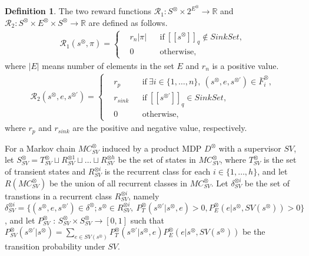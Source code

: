 \documentclass[10pt]{article}
\theoremstyle{definition}
\newtheorem{definition}{Definition}
\newcommand{\myspq}{\ensuremath{[\![s^{\otimes}]\!]}_q}
\newcommand{\myspdq}{\ensuremath{[\![s^{\otimes \prime}]\!]}_q}
\begin{document}
\begin{definition}
  The two reward functions $\mathcal{R}_1 : S^{\otimes} \times 2^{E^{\otimes}} \rightarrow \mathbb{R}$ and $\mathcal{R}_2 : S^{\otimes} \times E^{\otimes} \times S^{\otimes} \rightarrow \mathbb{R}$ are defined as follows.
  \begin{align}
    \mathcal{R}_1 (s^{\otimes}, \pi) =
    \left\{
    \begin{aligned}
      & r_{n}|\pi| & &\text{if} \ \myspq \notin SinkSet , \\
      & 0 & &\text{otherwise},
    \end{aligned}
    \right.
  \end{align}
  where $|E|$ means number of elements in the set $E$ and $r_{n}$ is a positive value.
  \begin{align}
    \mathcal{R}_2(s^{\otimes}, e, s^{\otimes \prime}) =
    \left\{
    \begin{aligned}
      &r_p & & \text{if}\ \exists i \in \! \{ 1, \ldots ,n \},\ (s^{\otimes}, e, s^{\otimes \prime}) \in \bar{F}^{\otimes}_i \!,\\
      &r_{sink} & & \text{if}\ \myspdq \in SinkSet,\\
      &0 & & \text{otherwise},
    \end{aligned}
    \right.
  \end{align}
  where $r_p$ and $r_{sink}$ are the positive and negative value, respectively.
  \label{reward_def}
\end{definition}

For a Markov chain $MC^{\otimes}_{SV}$ induced by a product MDP $D^{\otimes}$ with a supervisor $SV$, let $S^{\otimes}_{SV}= T^{\otimes}_{SV} \sqcup R^{\otimes 1}_{SV} \sqcup \ldots \sqcup R^{\otimes h}_{SV}$ be the set of states in $MC^{\otimes}_{SV}$, where $T^{\otimes}_{SV}$ is the set of transient states and $R^{\otimes i}_{SV}$ is the recurrent class for each $i \in \{ 1, \ldots ,h \}$, and let $R(MC^{\otimes}_{SV})$ be the union of all recurrent classes in $MC^{\otimes}_{SV}$. Let $\delta^{\otimes i}_{SV}$ be the set of transtions in a recurrent class $R^{\otimes i}_{SV}$, namely $\delta^{\otimes i}_{SV} = \{ (s^{\otimes}, e, s^{\otimes \prime}) \in \delta^{\otimes} ; s^{\otimes} \in R^{\otimes i}_{SV},\ P^{\otimes}_T(s^{\otimes \prime}|s^{\otimes}, e) > 0, P^{\otimes}_E(e | s^{\otimes}, SV(s^{\otimes})) > 0 \}$, and let $P^{\otimes}_{SV}$ : $S^{\otimes}_{SV} \times S^{\otimes}_{SV} \rightarrow [0,1]$ such that $P^{\otimes}_{SV} (s^{\otimes \prime} | s^{\otimes}) = \sum_{e \in SV(s^{\otimes})} P^{\otimes}_T (s^{\otimes \prime} | s^{\otimes}, e) P^{\otimes}_E (e | s^{\otimes}, SV(s^{\otimes}))$ be the transition probability under $SV$.
\end{document}
